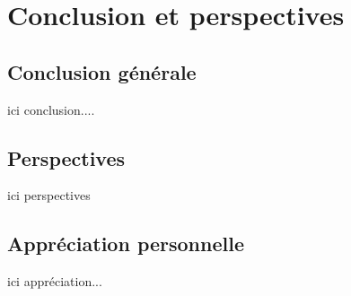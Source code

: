 \chapter*{Conclusion et perspectives}
\label{sec:conclusion}

\clearpage

\section*{Conclusion générale}

  ici conclusion....
    
   
    
    
    

\section*{Perspectives}

   ici perspectives
    
    
\section*{Appréciation personnelle}

    ici appréciation...





    


